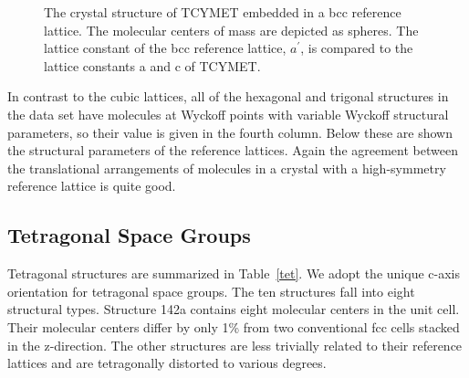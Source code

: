 \documentclass[preprint]{iucr}              %
\begin{document}
\begin{figure}
\begin{center}
 \caption[The
crystal structure of TCYMET embedded in a bcc reference
lattice.]{The crystal structure of TCYMET embedded in a bcc
reference lattice. The molecular centers of mass are depicted as
spheres. The lattice constant of the bcc reference lattice,
$a^\prime$, is compared to the lattice constants a and c of
TCYMET.\label{bccEmbed}}
\end{center}
\end{figure}

In contrast to the cubic lattices, all of the hexagonal and trigonal
structures in the data set have molecules at Wyckoff points with
variable Wyckoff structural parameters, so their value is given in
the fourth column. Below these are shown the structural parameters
of the reference lattices.  Again the agreement between the
translational arrangements of molecules in a crystal with a
high-symmetry reference lattice is quite good.

\subsection{Tetragonal Space Groups}
\label{sec:tet}

Tetragonal structures are summarized in Table~\ref{tet}. We adopt
the unique c-axis orientation for tetragonal space groups. The ten
structures fall into eight structural types. Structure 142a contains
eight molecular centers in the unit cell.  Their molecular centers
differ by only 1\% from two conventional fcc cells stacked in the
z-direction.  The other structures are less trivially related to
their reference lattices and are tetragonally distorted to various
degrees.
\end{document}
